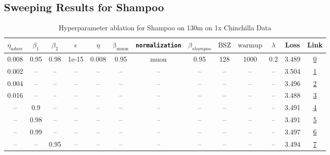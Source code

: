 \subsection{Sweeping Results for Shampoo}%
\begin{table}[H]
\centering
\caption{Hyperparameter ablation for Shampoo on 130m on 1x Chinchilla Data}
\label{tab:ablation_shampoo_130m_1}
\begin{tabular}{ccccccccccccc}
\toprule
$\eta_{adam}$ & $\beta_1$ & $\beta_2$ & $\epsilon$ & $\eta$ & $\mathrm{\beta_{muon}}$ & \texttt{normalization} & $\beta_{shampoo}$ & $\mathrm{BSZ}$ & $\mathrm{warmup}$ & $\lambda$ & Loss & Link \\
\midrule
0.008 & 0.95 & 0.98 & 1e-15 & 0.008 & 0.95 & muon & 0.95 & 128 & 1000 & 0.2 & 3.489 & \href{https://wandb.ai/stanford-mercury/optimizer-scaling/runs/sweep-130m-2B-mudamd5cea95lr0.008-wd0.2-minlr0-warmup1000-sb10.9-dd2fd2}{0} \\
\midrule
0.002 & -- & -- & -- & -- & -- & -- & -- & -- & -- & -- & 3.504 & \href{https://wandb.ai/stanford-mercury/optimizer-scaling/runs/sweep-130m-2B-mudamq5cea95lr0.008-wd0.2-minlr0-warmup1000-sb10.9-ad0e4a}{1} \\
0.004 & -- & -- & -- & -- & -- & -- & -- & -- & -- & -- & 3.496 & \href{https://wandb.ai/stanford-mercury/optimizer-scaling/runs/sweep-130m-2B-mudamv627c2elr0.008-alr0.004-wd0.2-minlr0-warmup10-1dd7ec}{2} \\
0.016 & -- & -- & -- & -- & -- & -- & -- & -- & -- & -- & 3.488 & \href{https://wandb.ai/stanford-mercury/optimizer-scaling/runs/sweep-130m-2B-mudamv4807cclr0.008-alr0.016-wd0.2-minlr0-warmup10-be2c83}{3} \\
-- & 0.9 & -- & -- & -- & -- & -- & -- & -- & -- & -- & 3.491 & \href{https://wandb.ai/stanford-mercury/optimizer-scaling/runs/sweep-130m-2B-mudamdacff5dlr0.008-wd0.2-minlr0-warmup1000-sb10.9-336531}{4} \\
-- & 0.98 & -- & -- & -- & -- & -- & -- & -- & -- & -- & 3.491 & \href{https://wandb.ai/stanford-mercury/optimizer-scaling/runs/sweep-130m-2B-mudamd70462blr0.008-wd0.2-minlr0-warmup1000-sb10.9-81138c}{5} \\
-- & 0.99 & -- & -- & -- & -- & -- & -- & -- & -- & -- & 3.497 & \href{https://wandb.ai/stanford-mercury/optimizer-scaling/runs/sweep-130m-2B-mudamdd32d07lr0.008-wd0.2-minlr0-warmup1000-sb10.9-4ee614}{6} \\
-- & -- & 0.95 & -- & -- & -- & -- & -- & -- & -- & -- & 3.494 & \href{https://wandb.ai/stanford-mercury/optimizer-scaling/runs/sweep-130m-2B-mudamd54e58blr0.008-wd0.2-minlr0-warmup1000-sb10.9-0daab5}{7} \\

\end{tabular}
\end{table}
